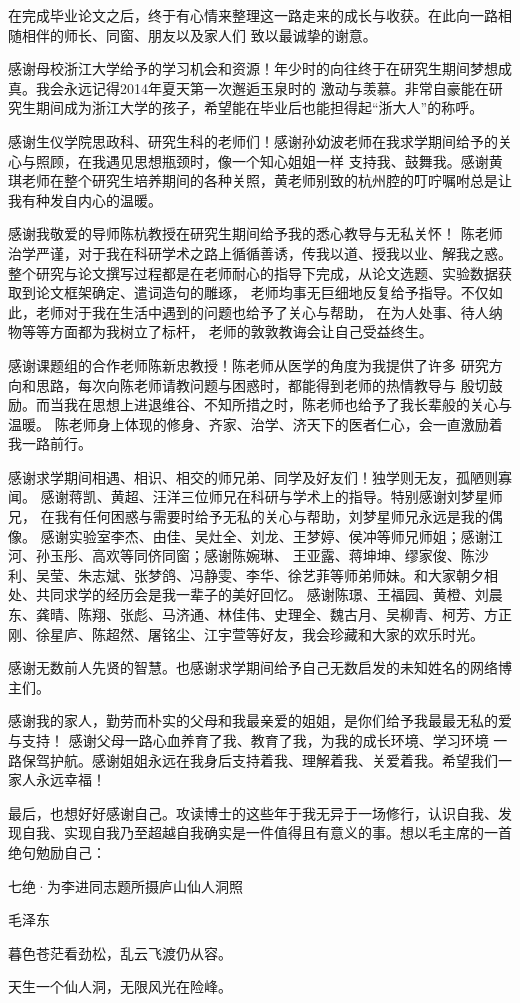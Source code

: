 \cleardoublepage
{}

在完成毕业论文之后，终于有心情来整理这一路走来的成长与收获。在此向一路相随相伴的师长、同窗、朋友以及家人们
致以最诚挚的谢意。

感谢母校浙江大学给予的学习机会和资源！年少时的向往终于在研究生期间梦想成真。我会永远记得2014年夏天第一次邂逅玉泉时的
激动与羡慕。非常自豪能在研究生期间成为浙江大学的孩子，希望能在毕业后也能担得起“浙大人”的称呼。

感谢生仪学院思政科、研究生科的老师们！感谢孙幼波老师在我求学期间给予的关心与照顾，在我遇见思想瓶颈时，像一个知心姐姐一样
支持我、鼓舞我。感谢黄琪老师在整个研究生培养期间的各种关照，黄老师别致的杭州腔的叮咛嘱咐总是让我有种发自内心的温暖。

感谢我敬爱的导师陈杭教授在研究生期间给予我的悉心教导与无私关怀！
陈老师治学严谨，对于我在科研学术之路上循循善诱，传我以道、授我以业、解我之惑。
整个研究与论文撰写过程都是在老师耐心的指导下完成，从论文选题、实验数据获取到论文框架确定、遣词造句的雕琢，
老师均事无巨细地反复给予指导。不仅如此，老师对于我在生活中遇到的问题也给予了关心与帮助，
在为人处事、待人纳物等等方面都为我树立了标杆，
老师的敦敦教诲会让自己受益终生。

感谢课题组的合作老师陈新忠教授！陈老师从医学的角度为我提供了许多
研究方向和思路，每次向陈老师请教问题与困惑时，都能得到老师的热情教导与
殷切鼓励。而当我在思想上进退维谷、不知所措之时，陈老师也给予了我长辈般的关心与温暖。
陈老师身上体现的修身、齐家、治学、济天下的医者仁心，会一直激励着我一路前行。

感谢求学期间相遇、相识、相交的师兄弟、同学及好友们！独学则无友，孤陋则寡闻。
感谢蒋凯、黄超、汪洋三位师兄在科研与学术上的指导。特别感谢刘梦星师兄，
在我有任何困惑与需要时给予无私的关心与帮助，刘梦星师兄永远是我的偶像。
感谢实验室李杰、由佳、吴灶全、刘龙、王梦婷、侯冲等师兄师姐；感谢江河、孙玉彤、高欢等同侪同窗；感谢陈婉琳、
王亚露、蒋坤坤、缪家俊、陈沙利、吴莹、朱志斌、张梦鸽、冯静雯、李华、徐艺菲等师弟师妹。和大家朝夕相处、共同求学的经历会是我一辈子的美好回忆。
感谢陈璟、王福园、黄橙、刘晨东、龚晴、陈翔、张彪、马济通、林佳伟、史理全、魏古月、吴柳青、柯芳、方正刚、徐星庐、陈超然、屠铭尘、江宇萱等好友，我会珍藏和大家的欢乐时光。

感谢无数前人先贤的智慧。也感谢求学期间给予自己无数启发的未知姓名的网络博主们。

感谢我的家人，勤劳而朴实的父母和我最亲爱的姐姐，是你们给予我最最无私的爱与支持！
感谢父母一路心血养育了我、教育了我，为我的成长环境、学习环境
一路保驾护航。感谢姐姐永远在我身后支持着我、理解着我、关爱着我。希望我们一家人永远幸福！

最后，也想好好感谢自己。攻读博士的这些年于我无异于一场修行，认识自我、发现自我、实现自我乃至超越自我确实是一件值得且有意义的事。想以毛主席的一首绝句勉励自己：

\bigskip
\centerline{七绝·为李进同志题所摄庐山仙人洞照}
\centerline{毛泽东}
\centerline{暮色苍茫看劲松，乱云飞渡仍从容。}
\centerline{天生一个仙人洞，无限风光在险峰。}

